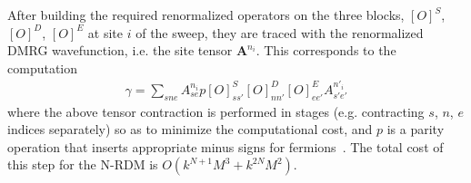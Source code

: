 After building the required renormalized operators on the three blocks, $[O]^S$, $[O]^D$, $[O]^E$ at site $i$ of the sweep, they are
traced with the renormalized DMRG wavefunction, i.e. the site tensor $\mathbf{A}^{n_i}$. 
This corresponds to the computation
\begin{align}
\gamma = \sum_{sne} A^{n_i}_{se} p [O]^S_{ss'} [O]^D_{nn'} [O]^E_{ee'} A^{n'_i}_{s'e'} 
\end{align}
where the above tensor contraction is performed in stages (e.g. contracting $s$, $n$, $e$ indices separately) so as to minimize the computational cost,
and $p$ is a parity operation that inserts appropriate minus signs for
fermions~\cite{chan_highly_2002}. The total cost
of this step for the N-RDM is $O(k^{N+1}M^3+k^{2N}M^2)$.



